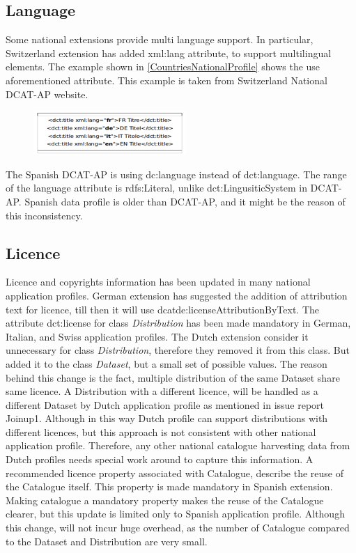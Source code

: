 \documentclass[<options>]{elsarticle}
\begin{document}

\subsection{Language}
Some national extensions provide multi language support. In particular, Switzerland extension has added xml:lang attribute, to support multilingual elements. The example shown in \ref{CountriesNationalProfile} shows the use aforementioned attribute. This example is taken from Switzerland National DCAT-AP website.

\begin{figure}[H]
\includegraphics{replace26.png}
\end{figure}

The Spanish DCAT-AP is using dc:language instead of  dct:language. The range of the language attribute is rdfs:Literal, unlike dct:LingusiticSystem in DCAT-AP. Spanish data profile is older than DCAT-AP, and it might be the reason of this inconsistency.  

\subsection{Licence}
Licence and copyrights information has been updated in many national application profiles. German extension has suggested the addition of attribution text for licence, till then it will use dcatde:licenseAttributionByText. The attribute dct:license for class \textit{Distribution} has been made mandatory in German, Italian, and Swiss application profiles. The Dutch extension consider it unnecessary for class \textit{Distribution}, therefore they removed it from this class. But added it to the class \textit{Dataset}, but a small set of possible values. The reason behind this change is the fact, multiple distribution of the same Dataset share same licence. A Distribution with a different licence, will be handled as a different Dataset by Dutch application profile as mentioned in issue report Joinup1. Although in this way Dutch profile can support distributions with different licences, but this approach is not consistent with other national application profile. Therefore, any other national catalogue harvesting data from Dutch profiles needs special work around to capture this information. 
A recommended licence property associated with Catalogue, describe the reuse of the Catalogue itself.  This property is made mandatory in Spanish extension. Making catalogue a mandatory property makes the reuse of the Catalogue clearer, but this update is limited only to Spanish application profile. Although this change, will not incur huge overhead, as the number of Catalogue compared to the Dataset and Distribution are very small.
\end{document}
